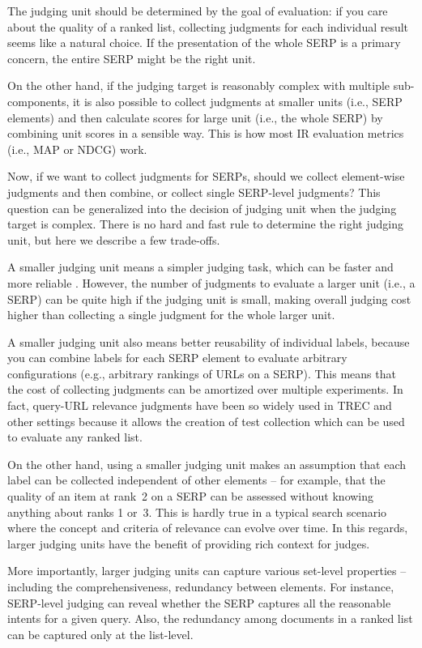 The judging unit should be determined by the goal of evaluation: if you care about the quality of a ranked list, collecting judgments for each individual result seems like a natural choice. If the presentation of the whole SERP is a primary concern, the entire SERP might be the right unit.

On the other hand, if the judging target is reasonably complex with multiple sub-components, it is also possible to collect judgments at smaller units (i.e., SERP elements) and then calculate scores for large unit (i.e., the whole SERP) by combining unit scores in a sensible way. This is how most IR evaluation metrics (i.e., MAP or NDCG) work.

Now, if we want to collect judgments for SERPs, should we collect element-wise judgments and then combine, or collect single SERP-level judgments? This question can be generalized into the decision of judging unit when the judging target is complex. There is no hard and fast rule to determine the right judging unit, but here we describe a few trade-offs. 

A smaller judging unit means a simpler judging task, which can be faster and more reliable . However, the number of judgments to evaluate a larger unit (i.e., a SERP) can be quite high if the judging unit is small, making overall judging cost higher than collecting a single judgment for the whole larger unit.\cite{}

A smaller judging unit also means better reusability of individual labels, because you can combine labels for each SERP element to evaluate arbitrary configurations (e.g., arbitrary rankings of URLs on a SERP). This means that the cost of collecting judgments can be amortized over multiple experiments. In fact, query-URL relevance judgments have been so widely used in TREC and other settings because it allows the creation of test collection which can be used to evaluate any ranked list.

On the other hand, using a smaller judging unit makes an assumption that each label can be collected independent of other elements -- for example, that the quality of an item at rank~2 on a SERP can be assessed without knowing anything about ranks 1 or~3. This is hardly true in a typical search scenario where the concept and criteria of relevance can evolve over time. In this regards, larger judging units have the benefit of providing rich context for judges. 

More importantly, larger judging units can capture various set-level properties -- including the comprehensiveness, redundancy between elements. For instance, SERP-level judging can reveal whether the SERP captures all the reasonable intents for a given query. Also, the redundancy among documents in a ranked list can be captured only at the list-level. 

